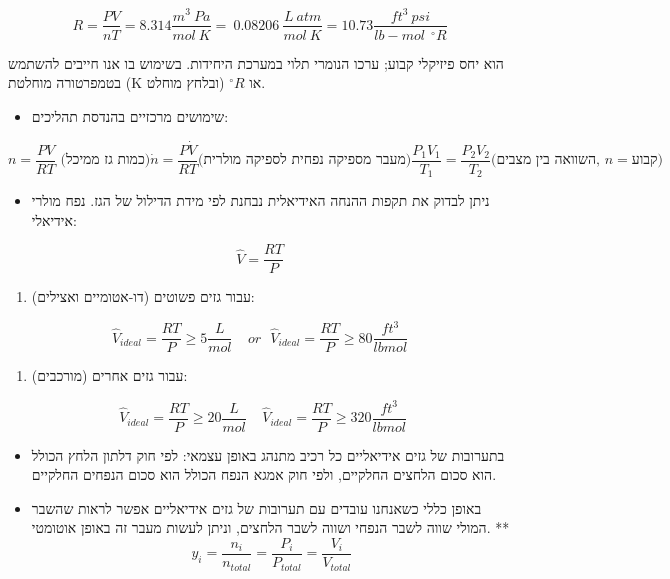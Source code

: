 \documentclass[
  hebrew,
  letterpaper,
  DIV=11,
  numbers=noendperiod]{scrreprt}
\providecommand{\tightlist}{%
  \setlength{\itemsep}{0pt}\setlength{\parskip}{0pt}}
\begin{document}
\[R = \frac{PV}{nT} = 8.314\frac{m^{3}\ Pa}{mol\ K} = \ 0.08206\ \frac{L\ atm}{mol\ K} = 10.73\frac{ft^{3}\ psi}{lb - mol\ \ {^\circ}R}\]

הוא יחס פיזיקלי קבוע; ערכו הנומרי תלוי במערכת היחידות. בשימוש בו אנו
חייבים להשתמש בטמפרטורה מוחלטת (K או \({^\circ}R\) (ובלחץ מוחלט.

\begin{itemize}
\tightlist
\item
  שימושים מרכזיים בהנדסת תהליכים:
\end{itemize}

\[{n = \frac{PV}{RT}\text{ (כמות גז ממיכל)}
}{\dot{n} = \frac{P\dot{V}}{RT}\text{(מעבר מספיקה נפחית לספיקה מולרית)}
}{\frac{P_{1}V_{1}}{T_{1}} = \frac{P_{2}V_{2}}{T_{2}}\text{(השוואה בין מצבים, }n = \text{קבוע)}
}\]

\begin{itemize}
\tightlist
\item
  ניתן לבדוק את תקפות ההנחה האידיאלית נבחנת לפי מידת הדילול של הגז. נפח
  מולרי אידיאלי:
\end{itemize}

\[\widehat{V} = \frac{RT}{P}\]

\begin{enumerate}
\def\labelenumi{\arabic{enumi}.}
\tightlist
\item
  עבור גזים פשוטים (דו-אטומיים ואצילים):
\end{enumerate}

\[{\widehat{V}}_{ideal} = \frac{RT}{P} \geq 5\frac{L}{mol}\ \ \ \ \ or\ \ \ {\widehat{V}}_{ideal} = \frac{RT}{P} \geq 80\frac{ft^{3}}{lbmol}\]

\begin{enumerate}
\def\labelenumi{\arabic{enumi}.}
\setcounter{enumi}{1}
\tightlist
\item
  עבור גזים אחרים (מורכבים):
\end{enumerate}

\[\ \ {\widehat{V}}_{ideal} = \frac{RT}{P} \geq 20\frac{L}{mol}\ \ \ \ \ {\widehat{V}}_{ideal} = \frac{RT}{P} \geq 320\frac{ft^{3}}{lbmol}\]

\begin{itemize}
\tightlist
\item
  בתערובות של גזים אידיאליים כל רכיב מתנהג באופן עצמאי: לפי חוק דלתון
  הלחץ הכולל הוא סכום הלחצים החלקיים, ולפי חוק אמגא הנפח הכולל הוא סכום
  הנפחים החלקיים.\\
\item
  באופן כללי כשאנחנו עובדים עם תערובות של גזים אידיאליים אפשר לראות
  שהשבר המולי שווה לשבר הנפחי ושווה לשבר הלחצים, וניתן לעשות מעבר זה
  באופן אוטומטי. **
  \[y_{i} = \frac{n_{i}}{n_{total}} = \frac{P_{i}}{P_{total}} = \frac{V_{i}}{V_{total}}\]
\end{itemize}
\end{document}
